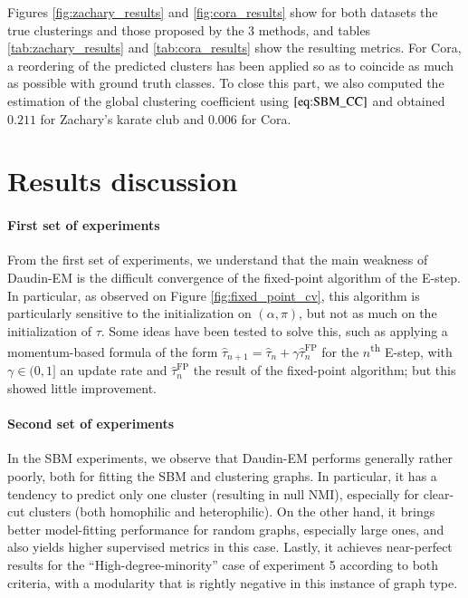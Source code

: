\documentclass[switch, 12pt]{article}
\begin{document}
\begin{multicols}{2}
    Figures \ref{fig:zachary_results} and \ref{fig:cora_results} show for both datasets the true clusterings and those proposed by the 3 methods, and tables \ref{tab:zachary_results} and \ref{tab:cora_results} show the resulting metrics. For Cora, a reordering of the predicted clusters has been applied so as to coincide as much as possible with ground truth classes. To close this part, we also computed the estimation of the global clustering coefficient using $\eqref{eq:SBM_CC}$ and obtained $0.211$ for Zachary's karate club and $0.006$ for Cora.






    \section{Results discussion}
    \label{sec:discussion}

    \paragraph{First set of experiments}
    From the first set of experiments, we understand that the main weakness of Daudin-EM is the difficult convergence of the fixed-point algorithm of the E-step. In particular, as observed on Figure \ref{fig:fixed_point_cv}, this algorithm is particularly sensitive to the initialization on $(\alpha, \pi)$, but not as much on the initialization of $\tau$. Some ideas have been tested to solve this, such as applying a momentum-based formula of the form $\hat{\tau}_{n+1} = \hat{\tau}_{n} + \gamma \hat{\tau}_{n}^{\mathrm{FP}}$ for the $n$\textsuperscript{th} E-step, with $\gamma \in (0, 1]$ an update rate and $\hat{\tau}_{n}^{\mathrm{FP}}$ the result of the fixed-point algorithm; but this showed little improvement.

    \paragraph{Second set of experiments}
    In the SBM experiments, we observe that Daudin-EM performs generally rather poorly, both for fitting the SBM and clustering graphs. In particular, it has a tendency to predict only one cluster (resulting in null NMI), especially for clear-cut clusters (both homophilic and heterophilic). On the other hand, it brings better model-fitting performance for random graphs, especially large ones, and also yields higher supervised metrics in this case. Lastly, it achieves near-perfect results for the ``High-degree-minority'' case of experiment 5 according to both criteria, with a modularity that is rightly negative in this instance of graph type.


\end{multicols}
\end{document}
